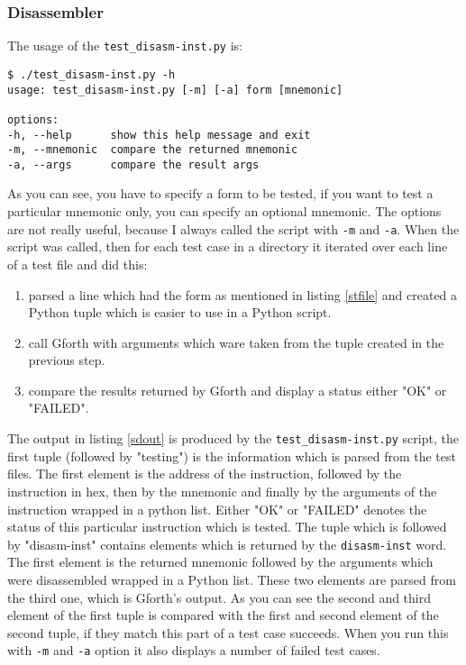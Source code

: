 \subsubsection{Disassembler}

The usage of the \texttt{test\_disasm-inst.py} is:

\begin{verbatim}
$ ./test_disasm-inst.py -h
usage: test_disasm-inst.py [-m] [-a] form [mnemonic]

options:
-h, --help      show this help message and exit
-m, --mnemonic  compare the returned mnemonic
-a, --args      compare the result args
\end{verbatim}

As you can see, you have to specify a form to be tested, if you want to test a
particular mnemonic only, you can specify an optional mnemonic. The options are
not really useful, because I always called the script with \texttt{-m} and
\texttt{-a}. When the script was called, then for each test case in a directory
it iterated over each line of a test file and did this:

\begin{enumerate}

    \item parsed a line which had the form as mentioned in listing \ref{stfile}
    and created a Python tuple which is easier to use in a Python script.
    \item call Gforth with arguments which ware taken from the tuple
    created in the previous step.
    \item compare the results returned by Gforth and display a status either
    "OK" or "FAILED".

\end{enumerate}

The output in listing \ref{sdout} is produced by the 
\texttt{test\_disasm-inst.py} script, the first tuple (followed by "testing") 
is the information which is parsed from the test 
files. The first element is the address of the instruction, followed by the 
instruction in hex, then by the mnemonic and finally by the arguments of the 
instruction wrapped in a python list. Either "OK" or "FAILED" denotes the status
of this particular instruction which is tested. The tuple which is followed by
"disasm-inst" contains elements which is returned by the \texttt{disasm-inst}
word. The first element is the returned mnemonic followed by the arguments which
were disassembled wrapped in a Python list. These two elements are parsed from
the third one, which is Gforth's output. As you can see the second and third
element of the first tuple is compared with the first and second element of the
second tuple, if they match this part of a test case succeeds. When you run this
with \texttt{-m} and \texttt{-a} option it also displays a number of failed
test cases.

